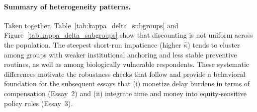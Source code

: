 \documentclass[doublespacing]{utdthesis}
\begin{document}
\paragraph{Summary of heterogeneity patterns.}
Taken together, Table~\ref{tab:kappa_delta_subgroups} and Figure~\ref{tab:kappa_delta_subgroups} show that discounting is not uniform across the population. The steepest short-run impatience (higher $\hat{\kappa}$) tends to cluster among groups with weaker institutional anchoring and less stable preventive routines, as well as among biologically vulnerable respondents. These systematic differences motivate the robustness checks that follow and provide a behavioral foundation for the subsequent essays that (i) monetize delay burdens in terms of compensation (Essay~2) and (ii) integrate time and money into equity-sensitive policy rules (Essay~3).
\end{document}
